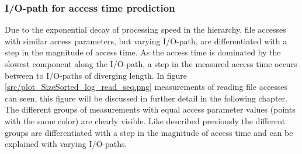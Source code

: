\documentclass{superfri}
\begin{document}
\subsubsection{I/O-path for access time prediction}
Due to the exponential decay of processing speed in the hierarchy, file accesses with similar access parameters, but varying I/O-path, are differentiated with a step in the magnitude of access time.
As the access time is dominated by the slowest component along the I/O-path, a step in the measured access time occurs between to I/O-paths of diverging length.
In figure \ref{src/plot_SizeSorted_log_read_seq.png} measurements of reading file accesses can seen, this figure will be discussed in further detail in the following chapter.
\\
The different groups of measurements with equal access parameter values (points with the same color) are clearly visible.
Like described previously the different groups are differentiated with a step in the magnitude of access time and can be explained with varying I/O-paths.
\end{document}
